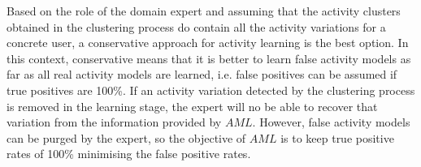 Based on the role of the domain expert and assuming that the activity clusters obtained in the clustering process do contain all the activity variations for a concrete user, a conservative approach for activity learning is the best option. In this context, conservative means that it is better to learn false activity models as far as all real activity models are learned, i.e. false positives can be assumed if true positives are 100\%. If an activity variation detected by the clustering process is removed in the learning stage, the expert will no be able to recover that variation from the information provided by $AML$. However, false activity models can be purged by the expert, so the objective of $AML$ is to keep true positive rates of 100\% minimising the false positive rates. 

